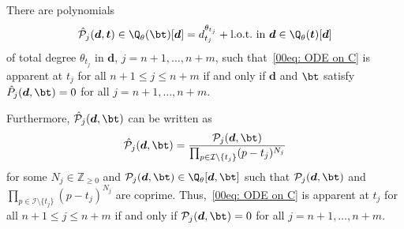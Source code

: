 \begin{Theorem} \label{prop: apparent}
 There are polynomials
 \[
 \hat{\mathcal{P}}_j(\boldsymbol d,\boldsymbol t)\in\Q_\theta(\bt)[\boldsymbol d]=d_{t_{j}}^{\theta_{t_j}}+ \text{l.o.t.\ in $\boldsymbol d$} \in \Q_\theta(\boldsymbol t)[\boldsymbol d]
 \]
 of total degree $\theta_{t_j}$ in $\boldsymbol d$, $j=n+1,\dots,n+m$,
 such that~\eqref{00eq: ODE on C}
 is apparent at $t_j$ for all $n+1\leq j\leq n+m$ if
 and only if $\boldsymbol{d}$ and $\bt$ satisfy $\hat{P}_j(\boldsymbol{d},\bt)=0$ for all
 $j=n+1,\dots,n+m$.

 Furthermore,
 $\hat{\mathcal{P}}_j(\boldsymbol{d},\bt)$ can be written as
 \begin{equation}\label{e22q:PP}\hat{\mathcal{P}}_j(\boldsymbol{d},\bt)=\frac{\mathcal{P}_j(\boldsymbol{d},\bt)}
 {\prod_{p\in\mathcal{I}\setminus\{t_j\}}(p-t_j)^{N_j}}\end{equation}
 for some $N_j\in\mathbb{Z}_{\geq 0}$ and $\mathcal{P}_j(\boldsymbol{d},\bt)\in \Q_{\theta}[\boldsymbol{d},\bt]$ such that $\mathcal{P}_j(\boldsymbol{d},\bt)$ and $\prod_{p\in\mathcal{I}\setminus\{t_j\}}(p-t_j)^{N_j}$ are coprime. Thus,~\eqref{00eq: ODE on C}
 is apparent at $t_j$ for all $n+1\leq j\leq n+m$ if
 and only if $\mathcal{P}_j(\boldsymbol{d},\bt)=0$ for all
 $j=n+1,\dots,n+m$.
\end{Theorem}

